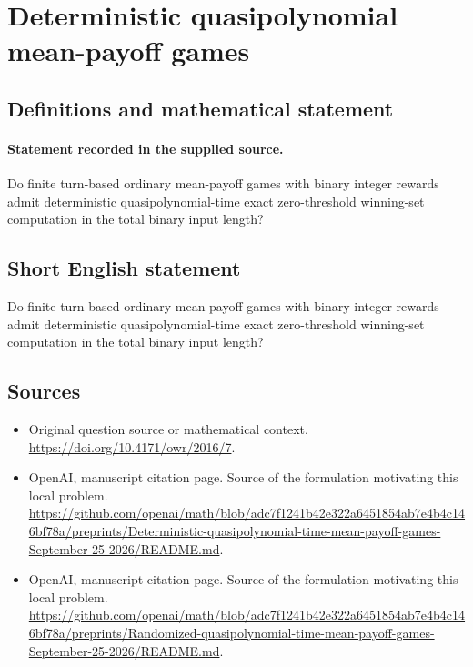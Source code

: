 \documentclass[11pt]{article}
\begin{document}
\section*{Deterministic quasipolynomial mean-payoff games}\label{30007472}
\subsection{Definitions and mathematical statement}
\paragraph{Statement recorded in the supplied source.}
Do finite turn-based ordinary mean-payoff games with binary integer rewards admit deterministic quasipolynomial-time exact zero-threshold winning-set computation in the total binary input length?
\subsection{Short English statement}
Do finite turn-based ordinary mean-payoff games with binary integer rewards admit deterministic quasipolynomial-time exact zero-threshold winning-set computation in the total binary input length?
\subsection{Sources}
\begin{itemize}
\item[S1] Original question source or mathematical context.
\url{https://doi.org/10.4171/owr/2016/7}.
\item[S2] OpenAI, manuscript citation page. Source of the formulation motivating this local problem.
\url{https://github.com/openai/math/blob/adc7f1241b42e322a6451854ab7e4b4c146bf78a/preprints/Deterministic-quasipolynomial-time-mean-payoff-games-September-25-2026/README.md}.
\item[S3] OpenAI, manuscript citation page. Source of the formulation motivating this local problem.
\url{https://github.com/openai/math/blob/adc7f1241b42e322a6451854ab7e4b4c146bf78a/preprints/Randomized-quasipolynomial-time-mean-payoff-games-September-25-2026/README.md}.
\end{itemize}
\end{document}
